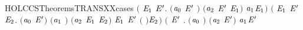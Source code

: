 \begin{SaveVerbatim}{HOLCCSTheoremsTRANSXXcases}
       \ensuremath{(}\HOLSymConst{\HOLTokenExists{}} \ensuremath{\HOLBoundVar{E}\sb{\mathrm{1}}} \ensuremath{\HOLBoundVar{E}\sp{\prime}}. \ensuremath{(}\ensuremath{\HOLBoundVar{a}\sb{\mathrm{0}}} \HOLSymConst{\ensuremath{=}} \ensuremath{\HOLBoundVar{E}\sp{\prime}} \HOLSymConst{\ensuremath{\mid}} \ensuremath{)} \HOLSymConst{\HOLTokenConj{}} \ensuremath{(}\ensuremath{\HOLBoundVar{a}\sb{\mathrm{2}}} \HOLSymConst{\ensuremath{=}} \ensuremath{\HOLBoundVar{E}\sp{\prime}} \HOLSymConst{\ensuremath{\mid}} \ensuremath{\HOLBoundVar{E}\sb{\mathrm{1}}}\ensuremath{)} \HOLSymConst{\HOLTokenConj{}}  \HOLTokenTransBegin\ensuremath{\HOLBoundVar{a}\sb{\mathrm{1}}}\HOLTokenTransEnd \ensuremath{\HOLBoundVar{E}\sb{\mathrm{1}}}\ensuremath{)} \HOLSymConst{\HOLTokenDisj{}}
       \ensuremath{(}\HOLSymConst{\HOLTokenExists{}}  \ensuremath{\HOLBoundVar{E}\sb{\mathrm{1}}} \ensuremath{\HOLBoundVar{E}\sp{\prime}} \ensuremath{\HOLBoundVar{E}\sb{\mathrm{2}}}.
            \ensuremath{(}\ensuremath{\HOLBoundVar{a}\sb{\mathrm{0}}} \HOLSymConst{\ensuremath{=}}  \HOLSymConst{\ensuremath{\mid}} \ensuremath{\HOLBoundVar{E}\sp{\prime}}\ensuremath{)} \HOLSymConst{\HOLTokenConj{}} \ensuremath{(}\ensuremath{\HOLBoundVar{a}\sb{\mathrm{1}}} \HOLSymConst{\ensuremath{=}} \HOLConst{\ensuremath{\tau}}\ensuremath{)} \HOLSymConst{\HOLTokenConj{}} \ensuremath{(}\ensuremath{\HOLBoundVar{a}\sb{\mathrm{2}}} \HOLSymConst{\ensuremath{=}} \ensuremath{\HOLBoundVar{E}\sb{\mathrm{1}}} \HOLSymConst{\ensuremath{\mid}} \ensuremath{\HOLBoundVar{E}\sb{\mathrm{2}}}\ensuremath{)} \HOLSymConst{\HOLTokenConj{}}
             \HOLTokenTransBegin{} \HOLTokenTransEnd \ensuremath{\HOLBoundVar{E}\sb{\mathrm{1}}} \HOLSymConst{\HOLTokenConj{}} \ensuremath{\HOLBoundVar{E}\sp{\prime}} \HOLTokenTransBegin{} \ensuremath{(} \ensuremath{)}\HOLTokenTransEnd \ensuremath{\HOLBoundVar{E}\sb{\mathrm{2}}}\ensuremath{)} \HOLSymConst{\HOLTokenDisj{}}
       \ensuremath{(}\HOLSymConst{\HOLTokenExists{}} \ensuremath{\HOLBoundVar{E}\sp{\prime}}  .
            \ensuremath{(}\ensuremath{\HOLBoundVar{a}\sb{\mathrm{0}}} \HOLSymConst{\ensuremath{=}}   \ensuremath{)} \HOLSymConst{\HOLTokenConj{}} \ensuremath{(}\ensuremath{\HOLBoundVar{a}\sb{\mathrm{2}}} \HOLSymConst{\ensuremath{=}}   \ensuremath{\HOLBoundVar{E}\sp{\prime}}\ensuremath{)} \HOLSymConst{\HOLTokenConj{}}  \HOLTokenTransBegin\ensuremath{\HOLBoundVar{a}\sb{\mathrm{1}}}\HOLTokenTransEnd \ensuremath{\HOLBoundVar{E}\sp{\prime}} \HOLSymConst{\HOLTokenConj{}}

\end{SaveVerbatim}

